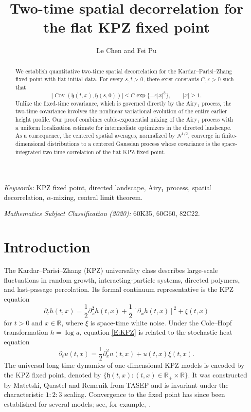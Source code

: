 \documentclass[12pt, reqno]{amsart}
\title[Two-time spatial decorrelation]{Two-time spatial decorrelation for the flat KPZ fixed point}
\author{Le Chen and Fei Pu}
\date{}
\numberwithin{equation}{section}
\theoremstyle{definition}
\newcommand{\R}{\mathbb{R}}
\newcommand{\h}{\mathfrak{h}}
\newcommand{\Cov}{\operatorname{Cov}}
\begin{document}
\begin{abstract}
  We establish quantitative two-time spatial decorrelation for the
  Kardar--Parisi--Zhang fixed point with flat initial data. For every $s,t>0$,
  there exist constants $C,c>0$ such that
  \[
    \big|\Cov(\h(t,x),\h(s,0))\big|
    \le C\exp\{-c|x|^3\},\qquad |x|\ge1.
  \]
  Unlike the fixed-time covariance, which is governed directly by the Airy$_1$
  process, the two-time covariance involves the nonlinear variational evolution
  of the entire earlier height profile. Our proof combines cubic-exponential
  mixing of the Airy$_1$ process with a uniform localization estimate for
  intermediate optimizers in the directed landscape. As a consequence, the
  centered spatial averages, normalized by $N^{1/2}$, converge in
  finite-dimensional distributions to a centered Gaussian process whose
  covariance is the space-integrated two-time correlation of the flat KPZ fixed
  point.
\end{abstract}

\maketitle
\medskip
\noindent\textit{Keywords:} KPZ fixed point, directed landscape, Airy$_1$ process,
spatial decorrelation, $\alpha$-mixing, central limit theorem.

\medskip
\noindent\textit{Mathematics Subject Classification (2020):}
60K35, 60G60, 82C22.

\medskip
\tableofcontents
\medskip

\section{Introduction}\label{S:problem}

The Kardar--Parisi--Zhang (KPZ) universality class describes large-scale
fluctuations in random growth, interacting-particle systems, directed polymers,
and last-passage percolation. Its formal
continuum representative is the KPZ equation
\begin{equation}\label{E:KPZ}
  \partial_t h(t,x)=\frac12\partial_x^2h(t,x)
  +\frac12[\partial_x h(t,x)]^2+\xi(t,x)
\end{equation}
for $t>0$ and $x\in\R$, where $\xi$ is space-time white noise. Under the
Cole--Hopf transformation $h=\log u$, equation \eqref{E:KPZ} is related to the
stochastic heat equation
\begin{equation}\label{E:SHE}
  \partial_tu(t,x)=\frac12\partial_x^2u(t,x)+u(t,x)\xi(t,x).
\end{equation}
The universal long-time dynamics of one-dimensional KPZ models is encoded by the
KPZ fixed point, denoted by $\{\h(t,x):(t,x)\in\R_+\times\R\}$. It was
constructed by Matetski, Quastel and Remenik \cite{matetski.quastel.ea:21:kpz}
from TASEP and is invariant under the characteristic $1:2:3$ scaling.
Convergence to the fixed point has since been established for several models;
see, for example, \cite{aggarwal.corwin.ea:24:kpz, virag:20:heat, wu:23:kpz}.
\end{document}
